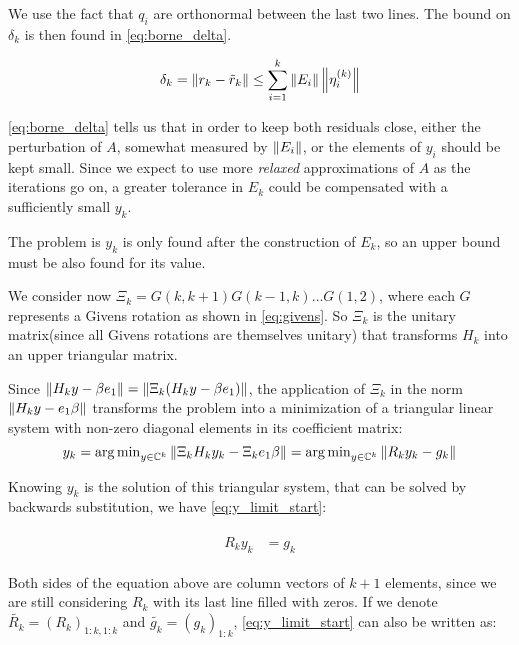 We use the fact that $q_{i}$ are orthonormal between the last two lines. The bound on $\delta_{k}$ is then found in \ref{eq:borne_delta}.


\begin{equation}\label{eq:borne_delta}
    \delta_{k} = \left\lVert r_{k} - \tilde{r}_{k}\right\rVert \leq \sum_{i=1}^{k} \left\lVert E_{i}\right\rVert \left\lVert\eta_{i}^{(k)}\right\rVert
\end{equation}

\ref{eq:borne_delta} tells us that in order to keep both residuals close, either the perturbation of $A$, somewhat measured by $\left\lVert E_{i}\right\rVert$, or the elements of $y_{i}$ should be kept small. Since we expect to use more \textit{relaxed} approximations of $A$ as the iterations go on, a greater tolerance in $E_{k}$ could be compensated with a sufficiently small $y_{k}$.


The problem is $y_{k}$ is only found after the construction of $E_{k}$, so an upper bound must be also found for its value.

We consider now $\Xi_{k} =G(k,k+1) G(k-1,k) \dots G(1,2)$, where each $G$ represents a Givens rotation as shown in \ref{eq:givens}. So $\Xi_{k}$ is the unitary matrix(since all Givens rotations are themselves unitary) that transforms $H_{k}$ into an upper triangular matrix.

Since $\left\lVert H_{k}y - \beta e_{1}\right\rVert=\left\lVert\Xi_{k}(H_{k}y - \beta e_{1})\right\rVert $, the application of $\Xi_{k}$ in the norm $ \left\lVert H_{k}y - e_{1}\beta\right\rVert $ transforms the problem into a minimization of a triangular linear system with non-zero diagonal elements in its coefficient matrix:
\begin{equation}
    y_{k} =\operatorname{arg\,min}_{y \in \mathbb{C}^{k}} \left\lVert\Xi_{k}H_{k}y_{k} - \Xi_{k}e_{1}\beta\right\rVert= \operatorname{arg\,min}_{y \in \mathbb{C}^{k}} \left\lVert R_{k}y_{k} - g_{k}\right\rVert
\end{equation}



Knowing $y_{k}$ is the solution of this triangular system, that can be solved by backwards substitution, we have \ref{eq:y_limit_start}:


\begin{align}\label{eq:y_limit_start}
    \begin{split}
        R_{k}y_{k}&=g_{k}
    \end{split}
\end{align}

Both sides of the equation above are column vectors of $k+1$ elements, since we are still considering $R_{k}$ with its last line filled with zeros. If we denote $\tilde{R_{k}} = (R_{k})_{1:k,1:k}$ and $\tilde{g_{k}}=(g_{k})_{1:k}$, \ref{eq:y_limit_start} can also be written as:

